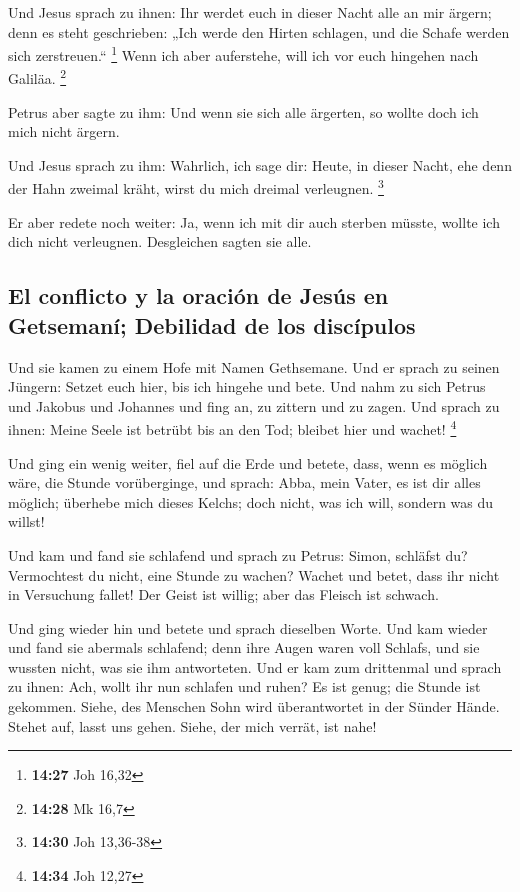  Und Jesus sprach zu ihnen: Ihr werdet euch in dieser
Nacht alle an mir ärgern; denn es steht geschrieben: „Ich werde den
Hirten schlagen, und die Schafe werden sich zerstreuen.`` \footnote{\textbf{14:27}
  Joh 16,32}  Wenn ich aber auferstehe, will ich vor euch
hingehen nach Galiläa. \footnote{\textbf{14:28} Mk 16,7}

 Petrus aber sagte zu ihm: Und wenn sie sich alle
ärgerten, so wollte doch ich mich nicht ärgern.

 Und Jesus sprach zu ihm: Wahrlich, ich sage dir: Heute,
in dieser Nacht, ehe denn der Hahn zweimal kräht, wirst du mich dreimal
verleugnen. \footnote{\textbf{14:30} Joh 13,36-38}

 Er aber redete noch weiter: Ja, wenn ich mit dir auch
sterben müsste, wollte ich dich nicht verleugnen. Desgleichen sagten sie
alle.

\hypertarget{el-conflicto-y-la-oraciuxf3n-de-jesuxfas-en-getsemanuxed-debilidad-de-los-discuxedpulos}{%
\subsection{El conflicto y la oración de Jesús en Getsemaní; Debilidad
de los
discípulos}\label{el-conflicto-y-la-oraciuxf3n-de-jesuxfas-en-getsemanuxed-debilidad-de-los-discuxedpulos}}

 Und sie kamen zu einem Hofe mit Namen Gethsemane. Und er
sprach zu seinen Jüngern: Setzet euch hier, bis ich hingehe und bete.
 Und nahm zu sich Petrus und Jakobus und Johannes und
fing an, zu zittern und zu zagen.  Und sprach zu ihnen:
Meine Seele ist betrübt bis an den Tod; bleibet hier und wachet!
\footnote{\textbf{14:34} Joh 12,27}

 Und ging ein wenig weiter, fiel auf die Erde und betete,
dass, wenn es möglich wäre, die Stunde vorüberginge,  und
sprach: Abba, mein Vater, es ist dir alles möglich; überhebe mich dieses
Kelchs; doch nicht, was ich will, sondern was du willst!

 Und kam und fand sie schlafend und sprach zu Petrus:
Simon, schläfst du? Vermochtest du nicht, eine Stunde zu wachen?
 Wachet und betet, dass ihr nicht in Versuchung fallet!
Der Geist ist willig; aber das Fleisch ist schwach.

 Und ging wieder hin und betete und sprach dieselben
Worte.  Und kam wieder und fand sie abermals schlafend;
denn ihre Augen waren voll Schlafs, und sie wussten nicht, was sie ihm
antworteten.  Und er kam zum drittenmal und sprach zu
ihnen: Ach, wollt ihr nun schlafen und ruhen? Es ist genug; die Stunde
ist gekommen. Siehe, des Menschen Sohn wird überantwortet in der Sünder
Hände.  Stehet auf, lasst uns gehen. Siehe, der mich
verrät, ist nahe!

